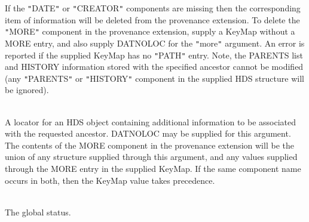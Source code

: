 \documentclass[twoside,11pt]{article}
\renewcommand{\_}{\texttt{\symbol{95}}}
\newcommand{\sstsubsection}[1]{ \item[{#1}] \mbox{} \\}
\newcommand{\sstsubsection}[1]{\item[{#1}]}
\begin{document}
{{{{         }
         If the {\tt "}DATE{\tt "} or {\tt "}CREATOR{\tt "} components are missing then the
         corresponding item of information will be deleted from the
         provenance extension. To delete the {\tt "}MORE{\tt "} component in the
         provenance extension, supply a KeyMap without a MORE entry, and
         also supply DAT\_NOLOC for the {\tt "}more{\tt "} argument. An error is
         reported if the supplied KeyMap has no {\tt "}PATH{\tt "} entry. Note, the
         PARENTS list and HISTORY information stored with the specified
         ancestor cannot be modified (any {\tt "}PARENTS{\tt "} or {\tt "}HISTORY{\tt "}
         component in the supplied HDS structure will be ignored).
      }
      \sstsubsection{
         MORE = CHARACTER $*$ (DAT\_\_SZLOC) (Given)
      }{
         A locator for an HDS object containing additional information to
         be associated with the requested ancestor. DAT\_\_NOLOC may be
         supplied for this argument. The contents of the MORE component
         in the provenance extension will be the union of any structure
         supplied through this argument, and any values supplied through
         the MORE entry in the supplied KeyMap. If the same component
         name occurs in both, then the KeyMap value takes precedence.
      }
      \sstsubsection{
         STATUS = INTEGER (Given and Returned)
      }{
         The global status.
      }
   }
}
\end{document}
